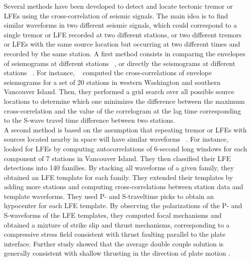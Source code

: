 \documentclass[draft]{agujournal2019}
\begin{document}
Several methods have been developed to detect and locate tectonic tremor or LFEs using the cross-correlation of seismic signals. The main idea is to find similar waveforms in two different seismic signals, which could correspond to a single tremor or LFE recorded at two different stations, or two different tremors or LFEs with the same source location but occurring at two different times and recorded by the same station. A first method consists in comparing the envelopes of seismograms at different stations ~\cite{OBA_2002, WEC_2008}, or directly the seismograms at different stations ~\cite{RUB_2013}. For instance, ~ computed the cross-correlations of envelope seismograms for a set of 20 stations in western Washington and southern Vancouver Island. Then, they performed a grid search over all possible source locations to determine which one minimizes the difference between the maximum cross-correlation and the value of the correlogram at the lag time corresponding to the S-wave travel time difference between two stations. \\

A second method is based on the assumption that repeating tremor or LFEs with sources located nearby in space will have similar waveforms ~\cite{BOS_2012, ROY_2014, SHE_2006, SHE_2007_nature}. For instance, ~ looked for LFEs by computing autocorrelations of 6-second long windows for each component of 7 stations in Vancouver Island. They then classified their LFE detections into 140 families. By stacking all waveforms of a given family, they obtained an LFE template for each family. They extended their templates by adding more stations and computing cross-correlations between station data and template waveforms. They used P- and S-traveltime picks to obtain an hypocenter for each LFE template. By observing the polarizations of the P- and S-waveforms of the LFE templates, they computed focal mechanisms and obtained a mixture of strike slip and thrust mechanisms, corresponding to a compressive stress field consistent with thrust faulting parallel to the plate interface. Further study showed that the average double couple solution is generally consistent with shallow thrusting in the direction of plate motion \cite{ROY_2014}. \\
\end{document}
